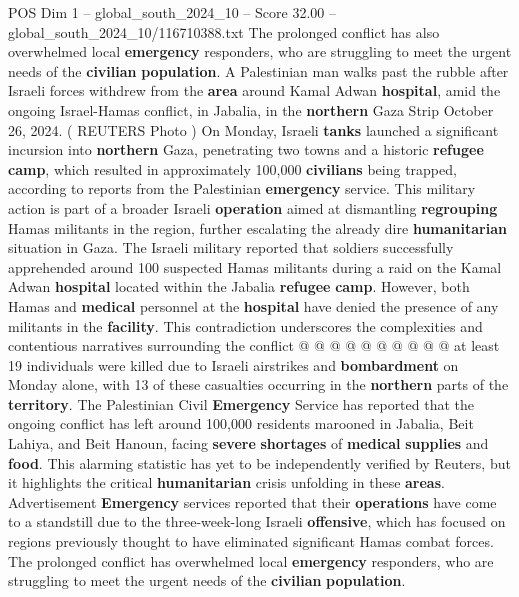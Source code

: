 \begin{textsample}{POS Dim 1 – global\_south\_2024\_10 – Score 32.00 – global\_south\_2024\_10/116710388.txt}  \label{ex:f1_pos_166}
The prolonged conflict has also overwhelmed local \textbf{emergency} responders, who are struggling to meet the urgent needs of the \textbf{civilian} \textbf{population}.
A Palestinian man walks past the rubble after Israeli forces withdrew from the \textbf{area} around Kamal Adwan \textbf{hospital}, amid the ongoing Israel-Hamas conflict, in Jabalia, in the \textbf{northern} Gaza Strip October 26, 2024. ( REUTERS Photo ) On Monday, Israeli \textbf{tanks} launched a significant incursion into \textbf{northern} Gaza, penetrating two towns and a historic \textbf{refugee} \textbf{camp}, which resulted in approximately 100,000 \textbf{civilians} being trapped, according to reports from the Palestinian \textbf{emergency} service.
This military action is part of a broader Israeli \textbf{operation} aimed at dismantling \textbf{regrouping} Hamas militants in the region, further escalating the already dire \textbf{humanitarian} situation in Gaza.
The Israeli military reported that soldiers successfully apprehended around 100 suspected Hamas militants during a raid on the Kamal Adwan \textbf{hospital} located within the Jabalia \textbf{refugee} \textbf{camp}.
However, both Hamas and \textbf{medical} personnel at the \textbf{hospital} have denied the presence of any militants in the \textbf{facility}.
This contradiction underscores the complexities and contentious narratives surrounding the conflict @ @ @ @ @ @ @ @ @ @ at least 19 individuals were killed due to Israeli airstrikes and \textbf{bombardment} on Monday alone, with 13 of these casualties occurring in the \textbf{northern} parts of the \textbf{territory}.
The Palestinian Civil \textbf{Emergency} Service has reported that the ongoing conflict has left around 100,000 residents marooned in Jabalia, Beit Lahiya, and Beit Hanoun, facing \textbf{severe} \textbf{shortages} of \textbf{medical} \textbf{supplies} and \textbf{food}.
This alarming statistic has yet to be independently verified by Reuters, but it highlights the critical \textbf{humanitarian} crisis unfolding in these \textbf{areas}.
Advertisement \textbf{Emergency} services reported that their \textbf{operations} have come to a standstill due to the three-week-long Israeli \textbf{offensive}, which has focused on regions previously thought to have eliminated significant Hamas combat forces.
The prolonged conflict has overwhelmed local \textbf{emergency} responders, who are struggling to meet the urgent needs of the \textbf{civilian} \textbf{population}.

\end{textsample}
